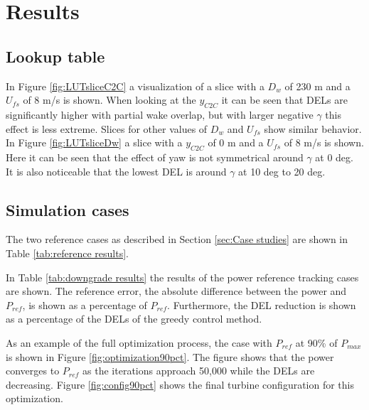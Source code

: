 \section{Results}

\subsection{Lookup table}
In Figure \ref{fig:LUTsliceC2C} a visualization of a slice with a $D_{w}$ of 230 m and a $U_{fs}$ of 8 m/s is shown. When looking at the $y_{C2C}$ it can be seen that DELs are significantly higher with partial wake overlap, but with larger negative $\gamma$ this effect is less extreme. Slices for other values of $D_{w}$ and $U_{fs}$ show similar behavior. In Figure \ref{fig:LUTsliceDw} a slice with a $y_{C2C}$ of 0 m and a $U_{fs}$ of 8 m/s is shown. Here it can be seen that the effect of yaw is not symmetrical around $\gamma$ at 0 deg. It is also noticeable that the lowest DEL is around $\gamma$ at 10 deg to 20 deg.

\subsection{Simulation cases} \label{sec:Simulation cases}
The two reference cases as described in Section \ref{sec:Case studies} are shown in Table \ref{tab:reference results}. 

In Table \ref{tab:downgrade results} the results of the power reference tracking cases are shown. The reference error, the absolute difference between the power and $P_{ref}$, is shown as a percentage of $P_{ref}$. Furthermore, the DEL reduction is shown as a percentage of the DELs of the greedy control method. 

As an example of the full optimization process, the case with $P_{ref}$ at 90\% of $P_{max}$ is shown in Figure \ref{fig:optimization90pct}. The figure shows that the power converges to $P_{ref}$ as the iterations approach 50,000 while the DELs are decreasing. Figure \ref{fig:config90pct} shows the final turbine configuration for this optimization. 

